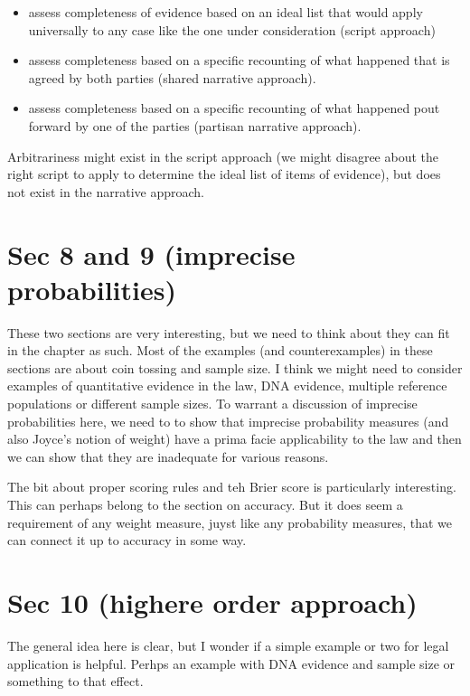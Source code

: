 \documentclass[
  10pt,
  dvipsnames,enabledeprecatedfontcommands]{scrartcl}
\begin{document}
\begin{itemize}
\item
  assess completeness of evidence based on an ideal list that would
  apply universally to any case like the one under consideration (script
  approach)
\item
  assess completeness based on a specific recounting of what happened
  that is agreed by both parties (shared narrative approach).
\item
  assess completeness based on a specific recounting of what happened
  pout forward by one of the parties (partisan narrative approach).
\end{itemize}

Arbitrariness might exist in the script approach (we might disagree
about the right script to apply to determine the ideal list of items of
evidence), but does not exist in the narrative approach.

\hypertarget{sec-8-and-9-imprecise-probabilities}{%
\section{Sec 8 and 9 (imprecise
probabilities)}\label{sec-8-and-9-imprecise-probabilities}}

These two sections are very interesting, but we need to think about they
can fit in the chapter as such. Most of the examples (and
counterexamples) in these sections are about coin tossing and sample
size. I think we might need to consider examples of quantitative
evidence in the law, DNA evidence, multiple reference populations or
different sample sizes. To warrant a discussion of imprecise
probabilities here, we need to to show that imprecise probability
measures (and also Joyce's notion of weight) have a prima facie
applicability to the law and then we can show that they are inadequate
for various reasons.

The bit about proper scoring rules and teh Brier score is particularly
interesting. This can perhaps belong to the section on accuracy. But it
does seem a requirement of any weight measure, juyst like any
probability measures, that we can connect it up to accuracy in some way.

\hypertarget{sec-10-highere-order-approach}{%
\section{Sec 10 (highere order
approach)}\label{sec-10-highere-order-approach}}

The general idea here is clear, but I wonder if a simple example or two
for legal application is helpful. Perhps an example with DNA evidence
and sample size or something to that effect.
\end{document}
